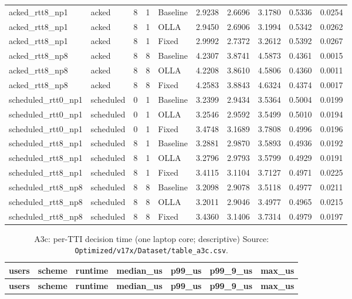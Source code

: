 \documentclass[10pt]{article}
\begin{document}
\begin{landscape}
\begin{longtable}{@{}llllllllll@{}}
acked\_rtt8\_np1 & acked & 8 & 1 & Baseline & 2.9238 & 2.6696 & 3.1780 & 0.5336 & 0.0254 \\
acked\_rtt8\_np1 & acked & 8 & 1 & OLLA & 2.9450 & 2.6906 & 3.1994 & 0.5342 & 0.0262 \\
acked\_rtt8\_np1 & acked & 8 & 1 & Fixed & 2.9992 & 2.7372 & 3.2612 & 0.5392 & 0.0267 \\
acked\_rtt8\_np8 & acked & 8 & 8 & Baseline & 4.2307 & 3.8741 & 4.5873 & 0.4361 & 0.0015 \\
acked\_rtt8\_np8 & acked & 8 & 8 & OLLA & 4.2208 & 3.8610 & 4.5806 & 0.4360 & 0.0011 \\
acked\_rtt8\_np8 & acked & 8 & 8 & Fixed & 4.2583 & 3.8843 & 4.6324 & 0.4374 & 0.0017 \\
scheduled\_rtt0\_np1 & scheduled & 0 & 1 & Baseline & 3.2399 & 2.9434 & 3.5364 & 0.5004 & 0.0199 \\
scheduled\_rtt0\_np1 & scheduled & 0 & 1 & OLLA & 3.2546 & 2.9592 & 3.5499 & 0.5010 & 0.0194 \\
scheduled\_rtt0\_np1 & scheduled & 0 & 1 & Fixed & 3.4748 & 3.1689 & 3.7808 & 0.4996 & 0.0196 \\
scheduled\_rtt8\_np1 & scheduled & 8 & 1 & Baseline & 3.2881 & 2.9870 & 3.5893 & 0.4936 & 0.0192 \\
scheduled\_rtt8\_np1 & scheduled & 8 & 1 & OLLA & 3.2796 & 2.9793 & 3.5799 & 0.4929 & 0.0191 \\
scheduled\_rtt8\_np1 & scheduled & 8 & 1 & Fixed & 3.4115 & 3.1104 & 3.7127 & 0.4971 & 0.0225 \\
scheduled\_rtt8\_np8 & scheduled & 8 & 8 & Baseline & 3.2098 & 2.9078 & 3.5118 & 0.4977 & 0.0211 \\
scheduled\_rtt8\_np8 & scheduled & 8 & 8 & OLLA & 3.2011 & 2.9046 & 3.4977 & 0.4965 & 0.0215 \\
scheduled\_rtt8\_np8 & scheduled & 8 & 8 & Fixed & 3.4360 & 3.1406 & 3.7314 & 0.4979 & 0.0197 \\
\bottomrule
\end{longtable}
\normalsize
\tiny
\setlength{\tabcolsep}{2pt}
\begin{longtable}{@{}lllllll@{}}
\caption{A3c: per-TTI decision time (one laptop core; descriptive) Source: \texttt{Optimized/v17x/Dataset/table\_a3c.csv}.}\\
\toprule
\textbf{users} & \textbf{scheme} & \textbf{runtime} & \textbf{median\_us} & \textbf{p99\_us} & \textbf{p99\_9\_us} & \textbf{max\_us} \\
\midrule
\endfirsthead
\toprule
\textbf{users} & \textbf{scheme} & \textbf{runtime} & \textbf{median\_us} & \textbf{p99\_us} & \textbf{p99\_9\_us} & \textbf{max\_us} \\

\end{longtable}
\end{landscape}
\end{document}

